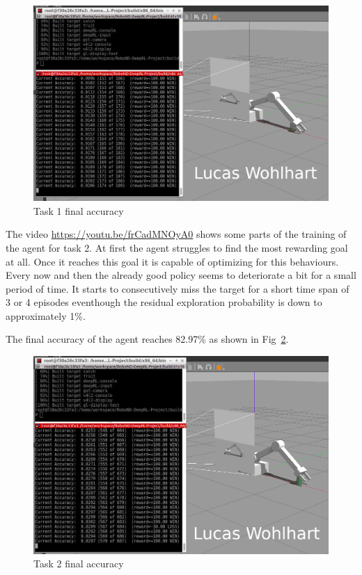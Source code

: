 \documentclass[10pt,journal,compsoc]{IEEEtran}
\begin{document}
\begin{figure}[thpb]
    \centering
    \includegraphics[width=0.85\linewidth]{img/task1_final.png}
    \caption{Task 1 final accuracy}
    \label{fig:task1_final}
\end{figure}

The video \href{https://youtu.be/frCadMNOyA0}{https://youtu.be/frCadMNOyA0} shows some parts of the training of the agent for task 2. At first the agent struggles to find the most rewarding goal at all. Once it reaches this goal it is capable of optimizing for this behaviours. Every now and then the already good policy seems to deteriorate a bit for a small period of time. It starts to consecutively miss the target for a short time span of 3 or 4 episodes eventhough the residual exploration probability is down to approximately 1\%.

The final accuracy of the agent reaches 82.97\% as shown in Fig~\ref{fig:task2_final}.


\begin{figure}[thpb]
    \centering
    \includegraphics[width=0.85\linewidth]{img/task2_final.png}
    \caption{Task 2 final accuracy}
    \label{fig:task2_final}
\end{figure}
\end{document}

